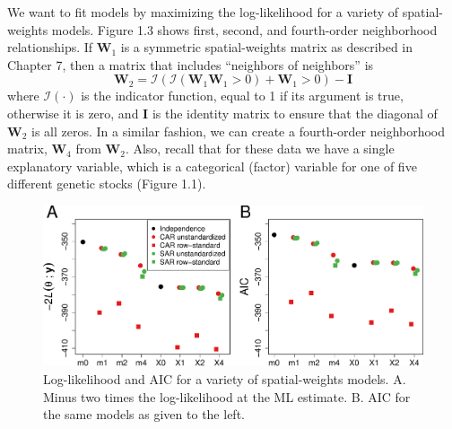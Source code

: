 \documentclass[12pt, titlepage]{article}
\begin{document}
We want to fit models by maximizing the log-likelihood for a variety of spatial-weights models. Figure 1.3 shows first, second, and fourth-order neighborhood relationships.  If $\mathbf{W}_{1}$ is a symmetric spatial-weights matrix as described in Chapter 7, then a matrix that includes ``neighbors of neighbors'' is
$$
\mathbf{W}_{2} = \mathcal{I}(\mathcal{I}(\mathbf{W}_{1}\mathbf{W}_{1} > 0) + \mathbf{W}_{1} > 0) - \mathbf{I}
$$
where $\mathcal{I}(\cdot)$ is the indicator function, equal to 1 if its argument is true, otherwise it is zero, and $\mathbf{I}$ is the identity matrix to ensure that the diagonal of $\mathbf{W}_{2}$ is all zeros.  In a similar fashion, we can create a fourth-order neighborhood matrix, $\mathbf{W}_{4}$ from $\mathbf{W}_{2}$.  Also, recall that for these data we have a single explanatory variable, which is a categorical (factor) variable for one of five different genetic stocks (Figure 1.1).

\begin{figure}[H]
  \begin{center}
	    \includegraphics[width=1\linewidth]{Seals_m2LL_AIC}
  \end{center}
  \caption{Log-likelihood and AIC for a variety of spatial-weights models. A. Minus two times the log-likelihood at the ML estimate. B. AIC for the same models as given to the left.  \label{Fig:Seals_m2LLAIC}}
\end{figure}
\end{document}
